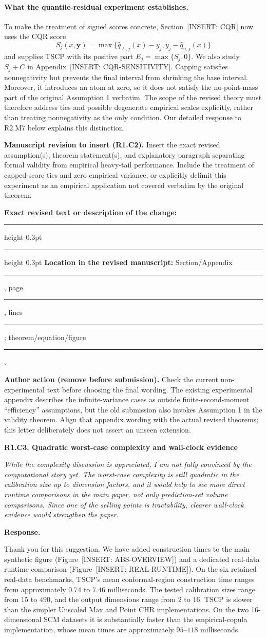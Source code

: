 \documentclass[11pt]{article}
\numberwithin{equation}{section}
\newcommand{\pending}[1]{\textcolor{AuthorRed}{[INSERT: #1]}}
\newcommand{\authoraction}[1]{%
  \par\begingroup\small\color{AuthorRed}%
  \textbf{Author action (remove before submission).} #1\par\endgroup}
\newcommand{\reviewercomment}[2]{%
  \par\medskip\noindent\textbf{#1}\par\nopagebreak
  \begingroup\color{ReviewerBlue}\itshape #2\par\endgroup
  \noindent\textbf{Response.} }
\newcommand{\revisionblock}[2]{%
  \par\begingroup\color{AuthorRed}\small
  \textbf{Manuscript revision to insert (#1).} #2\par
  \textbf{Exact revised text or description of the change:}\par
  \vspace{0.35em}\hrule height 0.3pt\vspace{1.4em}
  \hrule height 0.3pt\vspace{0.6em}
  \textbf{Location in the revised manuscript:}
  Section/Appendix \rule{1.3cm}{0.3pt},
  page \rule{1cm}{0.3pt},
  lines \rule{1.3cm}{0.3pt};
  theorem/equation/figure \rule{1.4cm}{0.3pt}.
  \par\endgroup}
\newcommand{\SecCQR}{Section~\pending{CQR}} %
\newcommand{\AppCQR}{Appendix~\pending{CQR-SENSITIVITY}} %
\newcommand{\FigAbsolute}{Figure~\pending{ABS-OVERVIEW}} %
\newcommand{\FigRuntime}{Figure~\pending{REAL-RUNTIME}} %
\begin{document}
\paragraph{What the quantile-residual experiment establishes.}
To make the treatment of signed scores concrete, \SecCQR{} now uses
the CQR score
\begin{equation}
  S_j(x,\bm y)
  =\max\{\widehat q_{\ell,j}(x)-y_j,
           y_j-\widehat q_{u,j}(x)\}
\end{equation}
and supplies TSCP with its positive part $E_j=\max\{S_j,0\}$. We also
study $S_j+C$ in \AppCQR{}. Capping satisfies nonnegativity but prevents
the final interval from shrinking the base interval. Moreover, it
introduces an atom at zero, so it does not satisfy the no-point-mass
part of the original Assumption 1 verbatim. The scope of the revised
theory must therefore address ties and possible degenerate empirical
scales explicitly, rather than treating nonnegativity as the only
condition. Our detailed response to R2.M7 below explains this distinction.

\revisionblock{R1.C2}{Insert the exact revised assumption(s), theorem
statement(s), and explanatory paragraph separating formal validity from
empirical heavy-tail performance. Include the treatment of capped-score
ties and zero empirical variance, or explicitly delimit this experiment
as an empirical application not covered verbatim by the original theorem.}

\authoraction{Check the current non-experimental text before choosing
the final wording. The existing experimental appendix describes the
infinite-variance cases as outside finite-second-moment ``efficiency''
assumptions, but the old submission also invokes Assumption 1 in the
validity theorem. Align that appendix wording with the actual revised
theorems; this letter deliberately does not assert an unseen extension.}

\reviewercomment{R1.C3. Quadratic worst-case complexity and wall-clock evidence}{%
While the complexity discussion is appreciated, I am not fully convinced
by the computational story yet. The worst-case complexity is still
quadratic in the calibration size up to dimension factors, and it would
help to see more direct runtime comparisons in the main paper, not only
prediction-set volume comparisons. Since one of the selling points is
tractability, clearer wall-clock evidence would strengthen the paper.}

Thank you for this suggestion. We have added construction times to the
main synthetic figure (\FigAbsolute{}) and a dedicated real-data
runtime comparison (\FigRuntime{}). On the six retained real-data
benchmarks, TSCP's mean conformal-region construction time ranges from
approximately $0.74$ to $7.46$ milliseconds. The tested calibration
sizes range from $15$ to $490$, and the output dimensions range from
$2$ to $16$. TSCP is slower than the simpler Unscaled Max and Point
CHR implementations. On the two 16-dimensional SCM datasets it is
substantially faster than the empirical-copula implementation, whose
mean times are approximately $95$--$118$ milliseconds.
\end{document}
